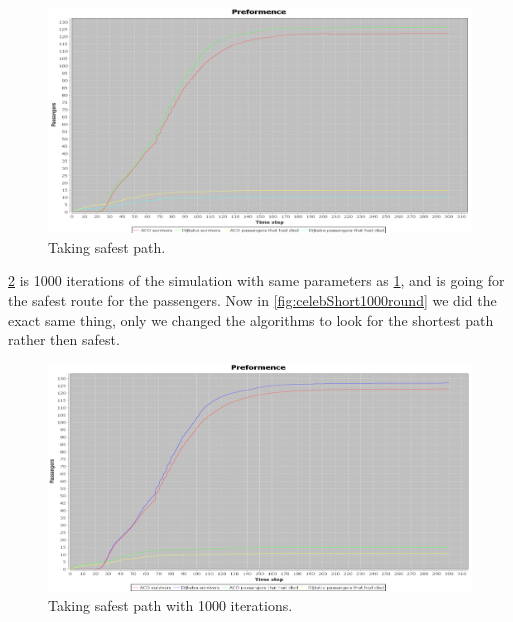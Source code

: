 \begin{figure} [h]
\centering
\hspace*{-1.0in}
\includegraphics[scale=0.35]{images/Graph-using-200-rounds-140-passangers-and-safest-first-one-hazzard.png}
\caption{Taking safest path.}
\label{fig:celebSafty}
\end{figure}


\ref{fig:celebSafty1000round} is 1000 iterations of the simulation with same parameters as \ref{fig:celebSafty}, and is going for the safest route for the passengers. Now in \ref{fig:celebShort1000round} we did the exact same thing, only we changed the algorithms to look for the shortest path rather then safest.

\begin{figure} [h]
\centering
\hspace*{-1.0in}
\includegraphics[scale=0.35]{images/Graph-using-1000-rounds-140-passangers-safest-path-and-one-fire.png}
\caption{Taking safest path with 1000 iterations.}
\label{fig:celebSafty1000round}
\end{figure}

